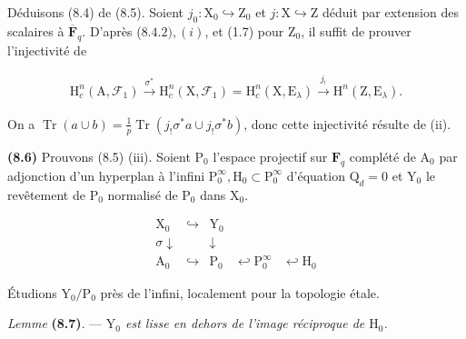 \documentclass[10pt,leqno]{article}
\begin{document}
\clearpage

\label{physical-33}\par\smallskip

\noindent Déduisons (8.4) de (8.5). Soient \(j_{0} : \mathrm{X}_{0} \hookrightarrow  \mathrm{Z}_{0}\) et \(j : \mathrm{X} \hookrightarrow  \mathrm{Z}\) déduit par extension des scalaires à \(\overline{\mathbf{F}}_{q}\). D'après (\(8.4.2), (i)\), et (1.7) pour \(\mathrm{Z}_{0}\), il suffit de prouver l'injectivité de\par

\begin{equation*}\begin{gathered}\mathrm{H}_{c}^{n}(\mathrm{A},\mathcal{F} _{1}) \xrightarrow{\sigma ^{*}} \mathrm{H}_{c}^{n}(\mathrm{X},\mathcal{F} _{1}) = \mathrm{H}_{c}^{n}(\mathrm{X},\mathrm{E}_{\lambda }) \xrightarrow{j_{!}} \mathrm{H}^{n}(\mathrm{Z},\mathrm{E}_{\lambda }).\end{gathered}\end{equation*}

\noindent On a \(\operatorname{Tr}(a \cup  b) = \frac{1}{p} \operatorname{Tr}(j_{!}\sigma ^{*}a \cup  j_{!}\sigma ^{*}b)\), donc cette injectivité résulte de (ii).\par

\noindent \textbf{(8.6)} Prouvons (8.5) (iii). Soient \(\mathrm{P}_{0}\) l'espace projectif sur \(\mathbf{F}_{q}\) complété de \(\mathrm{A}_{0}\) par adjonction d'un hyperplan à l'infini \(\mathrm{P}_{0}^{\infty }, \mathrm{H}_{0} \subset  \mathrm{P}_{0}^{\infty }\) d'équation \(\mathrm{Q}_{d} = 0\) et \(\mathrm{Y}_{0}\) le revêtement de \(\mathrm{P}_{0}\) normalisé de \(\mathrm{P}_{0}\) dans \(\mathrm{X}_{0}\).\par

\[\begin{array}{ccccc}\mathrm X_0&\hookrightarrow&\mathrm Y_0&&\\ {\scriptstyle\sigma}\downarrow&&\downarrow&&\\ \mathrm A_0&\hookrightarrow&\mathrm P_0&\hookleftarrow\mathrm P_0^\infty&\hookleftarrow\mathrm H_0\end{array}\tag{8.6.1}\]

\noindent Étudions \(\mathrm{Y}_{0}/\mathrm{P}_{0}\) près de l'infini, localement pour la topologie étale.\par

\noindent \emph{Lemme} \textbf{(8.7)}. — {\itshape \(\mathrm{Y}_{0}\) est lisse en dehors de l'image réciproque de \(\mathrm{H}_{0}\).}\par
\end{document}
